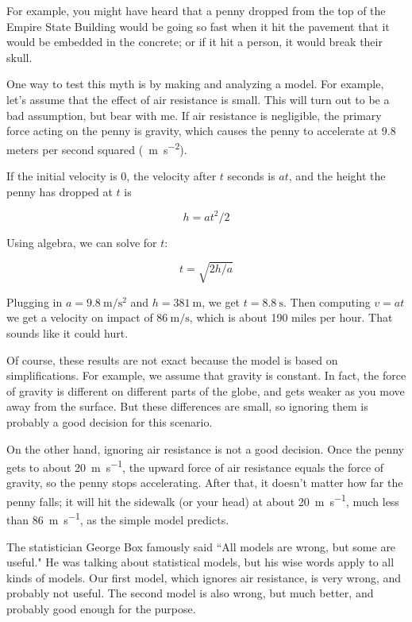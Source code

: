 \documentclass[12pt]{book}
\theoremstyle{exercise}
\begin{document}
For example, you might have heard that a penny dropped from the top of the Empire State Building would be going so fast when it hit the pavement that it would be embedded in the concrete; or if it hit a person, it would break their skull.

One way to test this myth is by making and analyzing a model.  For example, let's assume that the effect of air resistance is small.  This will turn out to be a bad assumption, but bear with me.  If air resistance is negligible, the primary force acting on the penny is gravity, which causes the penny to accelerate at 9.8 meters per second squared (\SI{}{\meter\per\second\squared}).

If the initial velocity is 0, the velocity after $t$ seconds is $at$, and the height the penny has dropped at $t$ is

\[ h = at^2/2 \]

Using algebra, we can solve for $t$:

\[ t = \sqrt{2h/a} \]

Plugging in $a = \SI{9.8}{\meter\per\second\squared}$ and $h=\SI{381}{\meter}$, we get $t = \SI{8.8}{\second}$.  Then computing $v=at$ we get a velocity on impact of $\SI{86}{\meter\per\second}$, which is about 190 miles per hour.  That sounds like it could hurt.

Of course, these results are not exact because the model is based on simplifications.  For example, we assume that gravity is constant.  In fact, the force of gravity is different on different parts of the globe, and gets weaker as you move away from the surface.  But these differences are small, so ignoring them is probably a good decision for this scenario.

On the other hand, ignoring air resistance is not a good decision.  Once the penny gets to about \SI{20}{\meter\per\second}, the upward force of air resistance equals the force of gravity, so the penny stops accelerating.  After that, it doesn't matter how far the penny falls; it will hit the sidewalk (or your head) at about \SI{20}{\meter\per\second}, much less than \SI{86}{\meter\per\second}, as the simple model predicts.

The statistician George Box famously said ``All models are wrong, but some are useful."  He was talking about statistical models, but his wise words apply to all kinds of models.  Our first model, which ignores air resistance, is very wrong, and probably not useful.  The second model is also wrong, but much better, and probably good enough for the purpose.
\end{document}
